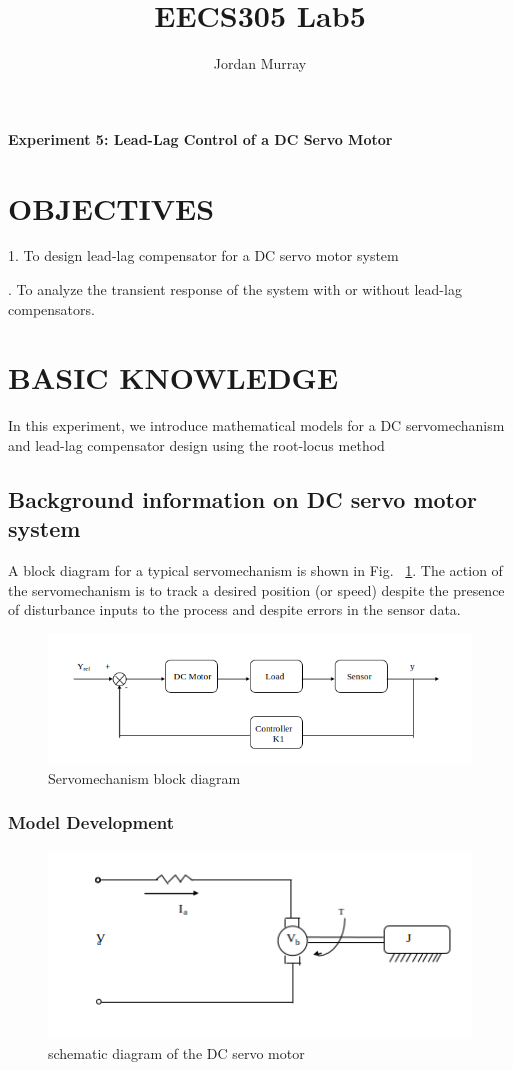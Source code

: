 \documentclass[11pt,a4paper]{article}
\author{Jordan Murray}
\title{EECS305 Lab5}
\begin{document}
\begin{center}
\fontsize{24}{12}\selectfont
\textbf{Experiment 5: Lead-Lag Control of a DC Servo Motor}
\end{center}
\section{OBJECTIVES}

1. To design lead-lag compensator for a DC servo motor system

. To analyze the transient response of the system with or without lead-lag compensators.


\section{BASIC KNOWLEDGE}
In this experiment, we introduce mathematical models for a DC servomechanism and lead-lag compensator design using the root-locus method

\subsection{Background information on DC servo motor system}

A block diagram for a typical servomechanism is shown in Fig. ~\ref{fig:servoblock}.  The action of the servomechanism is to track a desired position (or speed) despite the 
presence of disturbance inputs to the process and despite errors in the 
sensor data.

\begin{figure}[here]
\includegraphics[width=\textwidth]{imglab/servoblockdiagram.png}
\caption{Servomechanism block diagram}
\label{fig:servoblock}
\end{figure}

\subsubsection{Model Development}
\begin{figure}[here]
\includegraphics[width=\textwidth]{imglab/servoschemdiagram.png}
\caption{schematic diagram of the DC servo motor}
\label{fig:servoschem}
\end{figure}
\end{document}
